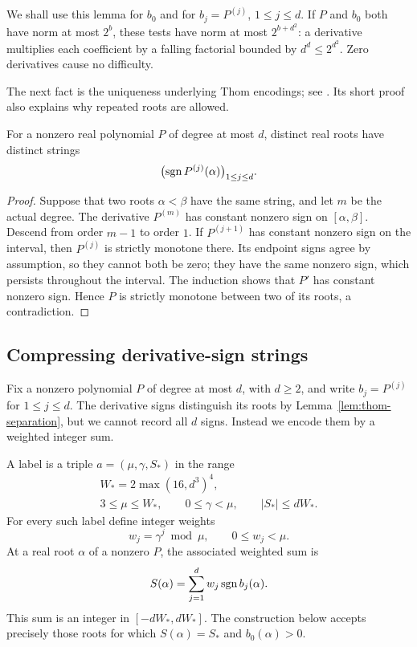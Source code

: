 We shall use this lemma for $b_0$ and for
$b_j=P^{(j)}$, $1\le j\le d$.  If $P$ and $b_0$ both have norm at
most $2^b$, these tests have norm at most $2^{b+d^2}$: a derivative
multiplies each coefficient by a falling factorial bounded by
$d^d\le2^{d^2}$.  Zero derivatives cause no difficulty.

The next fact is the uniqueness underlying Thom encodings; see
\cite[Proposition~2.28]{BasuPollackRoy2006}.  Its short proof also explains why repeated
roots are allowed.

\begin{lemma}\label{lem:thom-separation}
For a nonzero real polynomial $P$ of degree at most $d$, distinct real
roots have distinct strings
\[
                 \bigl(\operatorname{sgn} P^{(j)}(\alpha)\bigr)_{1\le j\le d}.
\]
\end{lemma}

\begin{proof}
Suppose that two roots $\alpha<\beta$ have the same string, and let $m$
be the actual degree.  The derivative $P^{(m)}$ has constant nonzero
sign on $[\alpha,\beta]$.  Descend from order $m-1$ to order $1$.
If $P^{(j+1)}$ has constant nonzero sign on the interval, then
$P^{(j)}$ is strictly monotone there.  Its endpoint signs agree by
assumption, so they cannot both be zero; they have the same nonzero
sign, which persists throughout the interval.  The induction shows that
$P'$ has constant nonzero sign.  Hence $P$ is strictly monotone between
two of its roots, a contradiction.
\end{proof}

\subsection{Compressing derivative-sign strings}

Fix a nonzero polynomial $P$ of degree at most $d$, with $d\ge2$, and
write $b_j=P^{(j)}$ for $1\le j\le d$.  The derivative signs distinguish
its roots by Lemma~\ref{lem:thom-separation}, but we cannot record all
$d$ signs.  Instead we encode them by a weighted integer sum.

A label is a triple
$a=(\mu,\gamma,S_*)$ in the range
\begin{equation}\label{eq:root-label-range}
 \begin{gathered}
 W_*=2\max(16,d^3)^4,\\
 3\le\mu\le W_*,\qquad
 0\le\gamma<\mu,\qquad
 |S_*|\le dW_*.
 \end{gathered}
\end{equation}
For every such label define integer weights
\[
                    w_j=\gamma^j\bmod\mu,\qquad 0\le w_j<\mu.
\]
At a real root $\alpha$ of a nonzero $P$, the associated weighted sum is
\[
                 S(\alpha)=\sum_{j=1}^d w_j\operatorname{sgn} b_j(\alpha).
\]
This sum is an integer in $[-dW_*,dW_*]$.  The construction below
accepts precisely those roots for which $S(\alpha)=S_*$ and
$b_0(\alpha)>0$.

